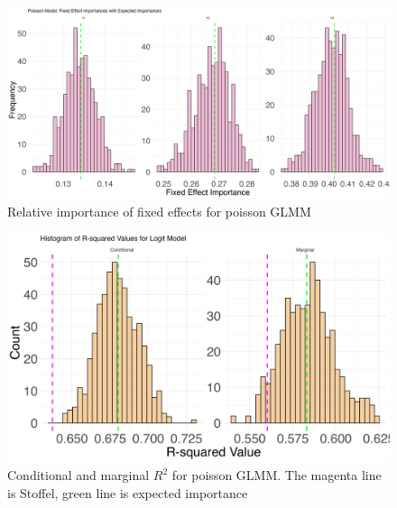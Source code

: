 \begin{figure}[H]
  \centering
    \includegraphics[width=0.7\linewidth]{Figures/Simulation study/Fixed_poisson.png}
    \caption{Relative importance of fixed effects for poisson GLMM}
    \label{fig:relimp_poisson_fixed}
\end{figure}
\begin{figure}[H]\ContinuedFloat
  \centering
  \includegraphics[width=0.7\linewidth]{Figures/Simulation study/R2_logit.png}
  \caption{Conditional and marginal $R^2$ for poisson GLMM. The magenta line is Stoffel, green line is expected importance}
    \label{fig:relimp_poisson_R2}
\end{figure}

